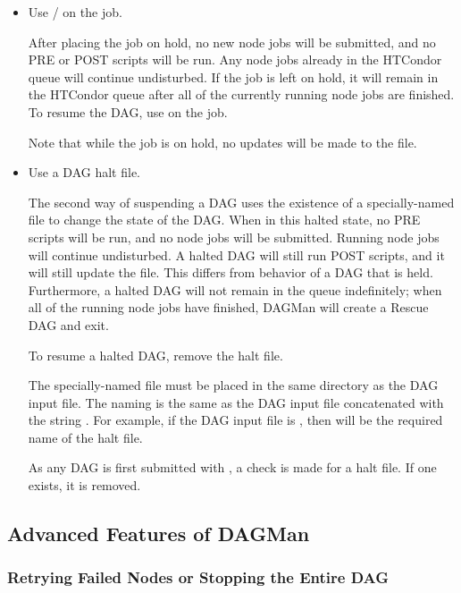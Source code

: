 \begin{itemize}
\item Use / on the  job.

After placing the  job on hold,
no new node jobs will be submitted,
and no PRE or POST scripts will be run.
Any node jobs already in the HTCondor queue will continue undisturbed.
If the  job is left on hold,
it will remain in the HTCondor queue after all of the currently running
node jobs are finished.
To resume the DAG, use  on the  job.

Note that while the  job is on hold,
no updates will be made to the  file.

\item Use a DAG halt file.

The second way of suspending a DAG uses the existence of a specially-named
file to change the state of the DAG.
When in this halted state,
no PRE scripts will be run, and no node jobs will be submitted.  
Running node jobs will continue undisturbed.
A halted DAG will still run POST scripts,
and it will still update the  file.
This differs from behavior of a DAG that is held.
Furthermore, a halted DAG will not remain in the queue indefinitely;
when all of the running node jobs have finished, 
DAGMan will create a Rescue DAG and exit.

To resume a halted DAG, remove the halt file.

The specially-named file must be placed in the same directory
as the DAG input file.
The naming is the same as the DAG input file concatenated with the
string .
For example, if the DAG input file is , 
then  will be the required name of the halt file.

As any DAG is first submitted with , 
a check is made for a halt file.
If one exists, it is removed.
\end{itemize}

\subsection{\label{sec:AdvDAGMan}Advanced Features of DAGMan}


\subsubsection{\label{dagman:retry}Retrying Failed Nodes or Stopping the Entire DAG}

